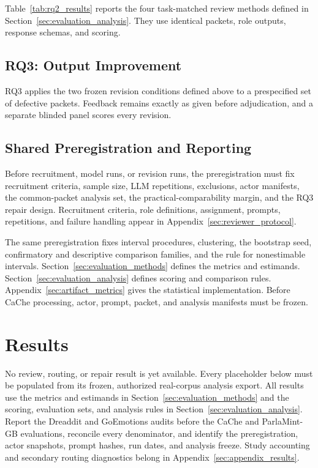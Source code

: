 Table~\ref{tab:rq2_results} reports the four task-matched review methods defined in Section~\ref{sec:evaluation_analysis}. They use identical packets, role outputs, response schemas, and scoring.

\subsection{RQ3: Output Improvement}

RQ3 applies the two frozen revision conditions defined above to a prespecified set of defective packets. Feedback remains exactly as given before adjudication, and a separate blinded panel scores every revision.

\subsection{Shared Preregistration and Reporting}

Before recruitment, model runs, or revision runs, the preregistration must fix recruitment criteria, sample size, LLM repetitions, exclusions, actor manifests, the common-packet analysis set, the practical-comparability margin, and the RQ3 repair design. Recruitment criteria, role definitions, assignment, prompts, repetitions, and failure handling appear in Appendix~\ref{sec:reviewer_protocol}.

The same preregistration fixes interval procedures, clustering, the bootstrap seed, confirmatory and descriptive comparison families, and the rule for nonestimable intervals. Section~\ref{sec:evaluation_methods} defines the metrics and estimands. Section~\ref{sec:evaluation_analysis} defines scoring and comparison rules. Appendix~\ref{sec:artifact_metrics} gives the statistical implementation. Before CaChe processing, actor, prompt, packet, and analysis manifests must be frozen.

\section{Results}

No review, routing, or repair result is yet available. Every placeholder below must be populated from its frozen, authorized real-corpus analysis export. All results use the metrics and estimands in Section~\ref{sec:evaluation_methods} and the scoring, evaluation sets, and analysis rules in Section~\ref{sec:evaluation_analysis}. Report the Dreaddit and GoEmotions audits before the CaChe and ParlaMint-GB evaluations, reconcile every denominator, and identify the preregistration, actor snapshots, prompt hashes, run dates, and analysis freeze. Study accounting and secondary routing diagnostics belong in Appendix~\ref{sec:appendix_results}.

